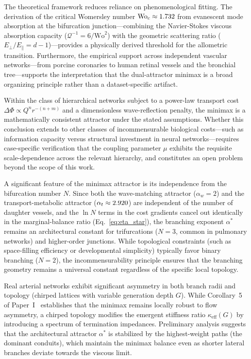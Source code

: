 The theoretical framework reduces reliance on phenomenological fitting.
The derivation of the critical Womersley number $\mathrm{Wo}_c \approx 1.732$
from evanescent mode absorption at the bifurcation junction---combining the
Navier-Stokes viscous absorption capacity ($\mathcal{Q}^{-1} = 6/\mathrm{Wo}^2$)
with the geometric scattering ratio ($E_\perp/E_\parallel = d-1$)---provides a
physically derived threshold for the allometric transition. Furthermore, the
empirical support across independent vascular networks---from porcine
coronaries to human retinal vessels and the bronchial tree---supports the
interpretation that the dual-attractor minimax is a broad organizing principle
rather than a dataset-specific artifact.

Within the class of hierarchical networks subject to a power-law transport cost
$\Delta\Phi \propto Q^n r^{-(n+m)}$ and a dimensionless wave-reflection penalty,
the minimax is a mathematically consistent attractor under the stated
assumptions. Whether this conclusion extends to other classes of
incommensurable biological costs---such as information capacity versus
structural investment in neural networks---requires case-specific verification
that the coupling parameter $\mu$ exhibits the requisite scale-dependence across
the relevant hierarchy, and constitutes an open problem beyond the scope of this
work.

\begin{remark}
A significant feature of the minimax attractor is its independence from the
bifurcation number $N$. Since both the wave-matching attractor ($\alpha_w=2$)
and the transport-metabolic attractor ($\alpha_t \approx 2.920$) are
independent of the number of daughter vessels, and the $\ln N$ terms in the cost
gradients cancel out identically in the marginal-balance ratio
(Eq.~\eqref{eq:eta_star}), the branching exponent $\alpha^*$ remains an
architectural constant for trifurcations ($N=3$, common in pulmonary networks)
and higher-order junctions. While topological constraints (such as space-filling
efficiency or developmental simplicity) typically favor binary branching
($N=2$), the incommensurability principle ensures that the branching geometry
remains a universal constant regardless of the specific local topology.
\end{remark}

\begin{remark}
Real arterial networks exhibit significant asymmetry in both branch radii and
topology (chirped lattices with variable generation depth $G$). While
Corollary~5 of Paper~I~\cite{paperI} establishes that the minimax remains
locally robust to flow asymmetry, a chirped topology modifies the emergent
stiffness ratio $\kappa_{\mathrm{eff}}(G)$ by introducing a spectrum of
termination impedances. Preliminary analysis suggests that the architectural
attractor $\alpha^*$ is stabilized by the highest-weight paths (the dominant
conduits), which maintain the minimax balance even as shorter lateral branches
deviate towards the viscous limit.
\end{remark}

